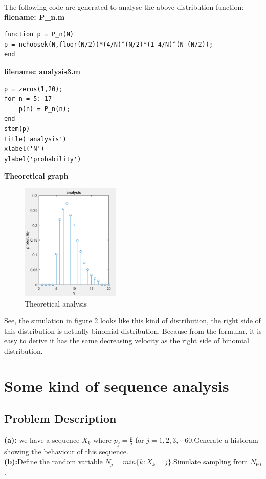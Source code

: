 \documentclass[twoside]{article}
\begin{document}
\begin{multicols}{2}
\noindent The following code are generated to analyse the above distribution function:\\
\noindent \textbf {filename: P\_n.m}\\
\begin{lstlisting}
function p = P_n(N)
p = nchoosek(N,floor(N/2))*(4/N)^(N/2)*(1-4/N)^(N-(N/2));
end
\end{lstlisting}
\noindent \textbf {filename: analysis3.m}
\begin{lstlisting}
p = zeros(1,20);
for n = 5: 17
    p(n) = P_n(n);
end
stem(p)
title('analysis')
xlabel('N')
ylabel('probability')
\end{lstlisting}
\noindent \textbf {Theoretical graph}
\begin{figure}[H]
   \centering
   \includegraphics[width = 0.42\textwidth]{../data/analysis3.png}  
   \caption{Theoretical analysis}
\end{figure}
\end{multicols}
See, the simulation in figure 2 looks like this kind of distribution, the right side of this distribution is actually binomial distribution. Because from the formular, it is easy to derive it has the same decreasing velocity as the right side of binomial distribution.\\

\section{Some kind of sequence analysis}
\subsection{\normalsize{Problem Description}}
\noindent \textbf {(a):} we have a sequence $X_k$ where $p_j = \frac{p}{j}$ for $j = 1,2,3,\cdots 60$.Generate a historam showing the behaviour of this sequence. \\
\noindent \textbf {(b):}Define the random variable $N_j = min\{k:X_k = j\}$.Simulate sampling from $N_60$.\\
\end{document}
